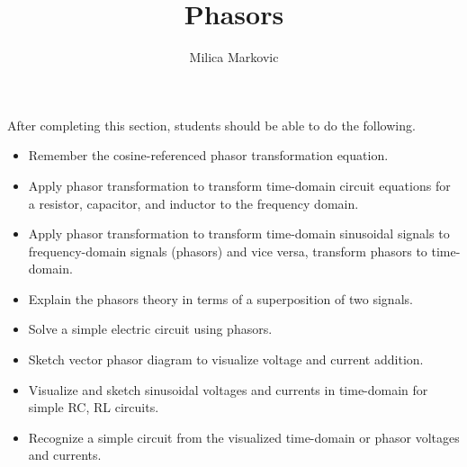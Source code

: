 \documentclass{ximera}
\title{Phasors}
\author{Milica Markovic}
\begin{document}
\begin{abstract}
\end{abstract}

\maketitle

\begin{sectionOutcomes}

After completing this section, students should be able to do the following.

\begin{itemize}
\item Remember the cosine-referenced phasor transformation equation.
\item Apply phasor transformation to transform time-domain circuit equations for a resistor, capacitor, and inductor to the frequency domain.
\item Apply phasor transformation to transform time-domain sinusoidal signals to frequency-domain signals (phasors) and vice versa, transform phasors to time-domain.
\item Explain the phasors theory in terms of a superposition of two signals.
\item Solve a simple electric circuit using phasors.
\item Sketch vector phasor diagram to visualize voltage and current addition.
\item Visualize and sketch sinusoidal voltages and currents in time-domain for simple RC, RL circuits.
\item Recognize a simple circuit from the visualized time-domain or phasor voltages and currents.
\end{itemize}

\end{sectionOutcomes}
\end{document}
